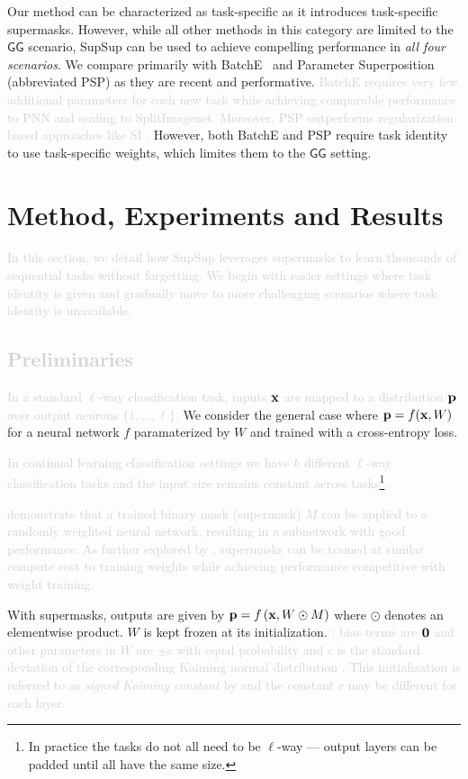 \documentclass{article}
\newcommand{\ac}{SupSup\xspace}
\newcommand{\comments}[1]{#1}
\newcommand{\comments}[1]{}
\newcommand{\removed}[1]{\comments{\textcolor{lightgray}{#1}}}
\newcommand{\casename}[1]{\ensuremath{\mathsf{#1}}\xspace}
\begin{document}
Our method can be characterized as task-specific as it introduces task-specific supermasks.
However, while all other methods in this category are limited to the \casename{GG} scenario, SupSup can be used to achieve compelling performance in \emph{all four scenarios}.
We compare primarily with BatchE~\cite{wen2020batchensemble} and Parameter Superposition (abbreviated PSP) \cite{cheung2019superposition} as they are recent and performative. \removed{BatchE requires very few additional parameters for each new task while achieving comparable performance to PNN and scaling to SplitImagenet. Moreover, PSP outperforms regularization based approaches like SI \cite{zenke2017continual}.}
However, both BatchE and PSP require task identity to use task-specific weights, which limites them to the \casename{GG} setting.
\vspace*{-1ex}
\section{Method, Experiments and Results} \label{sec:method}
\vspace*{-1ex}

\removed{In this section, we detail how \ac leverages supermasks to learn thousands of sequential tasks without forgetting. We begin with easier settings where task identity is given and gradually move to more challenging scenarios where task identity is unavailable.

\subsection{Preliminaries}
}
\removed{In a standard $\ell$-way classification task, inputs $\mathbf{x}$ are mapped to a distribution $\mathbf{p}$ over output neurons $\{1,...,\ell\}$.} 
We consider the general case where $\mathbf{p} = f(\mathbf{x}, W)$ for a neural network $f$ paramaterized by $W$ and trained with a cross-entropy loss.\removed{ In continual learning classification settings we have $k$ different $\ell$-way classification tasks and the input size remains constant across tasks\footnote{In practice the tasks do not all need to be $\ell$-way --- output layers can be padded until all have the same size.}.

\citet{zhou2019deconstructing} demonstrate that a trained binary mask (supermask) $M$ can be applied to a randomly weighted neural network, resulting in a subnetwork with good performance. As further explored by \citet{ramanujan2019s}, supermasks can be trained at similar compute cost to training weights while achieving performance competitive with weight training.}
%
With supermasks, outputs are given by $\mathbf{p} = f\left( \mathbf{x}, W \odot M \right)$ where $\odot$ denotes an elementwise product. $W$ is kept frozen at its initialization. \removed{: bias terms are $\mathbf{0}$ and other parameters in $W$  are $\pm c$ with equal probability and $c$ is the standard deviation of the corresponding Kaiming normal distribution \cite{he2015delving}. This initialization is referred to as \textit{signed Kaiming constant} by \cite{ramanujan2019s} and the constant $c$ may be different for each layer.}
\end{document}
